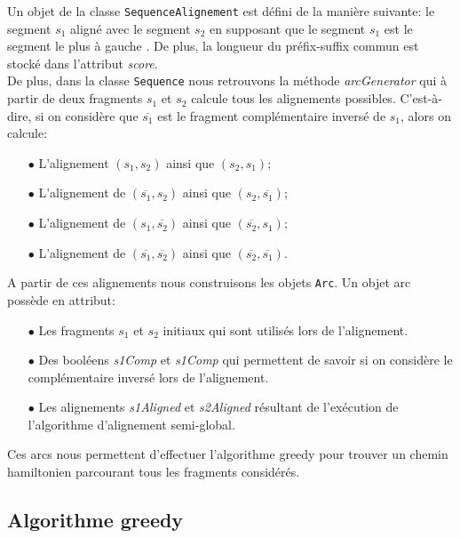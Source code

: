 Un objet de la classe \verb|SequenceAlignement| est défini de la manière suivante: le segment $s_1$ aligné avec le segment $s_2$ en supposant que le segment $s_1$ est le segment le plus à \og gauche \fg. De plus, la longueur du préfix-suffix commun est stocké dans l'attribut \emph{score}.\\

De plus, dans la classe \verb|Sequence| nous retrouvons la méthode \emph{arcGenerator} qui à partir de deux fragments $s_1$ et $s_2$ calcule tous les alignements possibles. C'est-à-dire, si on considère que $\overline{s_1}$ est le fragment complémentaire inversé de $s_1$, alors on calcule:\\
\begin{itemize}
	\item[$\bullet$] L'alignement $(s_1,s_2)$ ainsi que $(s_2,s_1)$;
	\item[$\bullet$] L'alignement de $(\overline{s_1},s_2)$ ainsi que $(s_2, \overline{s_1})$;
	\item[$\bullet$] L'alignement de $(s_1, \overline{s_2})$ ainsi que $(\overline{s_2},s_1)$;
	\item[$\bullet$] L'alignement de $(\overline{s_1}, \overline{s_2})$ ainsi que $(\overline{s_2}, \overline{s_1})$.
\end{itemize}
$ $\\
A partir de ces alignements nous construisons les objets \verb|Arc|. Un objet arc possède en attribut:\\

\begin{itemize}
	\item[$\bullet$] Les fragments $s_1$ et $s_2$ initiaux qui sont utilisés lors de l'alignement.
	\item[$\bullet$] Des booléens \emph{s1Comp} et \emph{s1Comp} qui permettent de savoir si on considère le complémentaire inversé lors de l'alignement.
	\item[$\bullet$] Les alignements \emph{s1Aligned} et \emph{s2Aligned}  résultant de l'exécution de l'algorithme d'alignement semi-global.
\end{itemize}
	
Ces arcs nous permettent d'effectuer l'algorithme greedy pour trouver un chemin hamiltonien parcourant tous les fragments considérés.


\subsection{Algorithme greedy}
\label{subsection:greedy}

